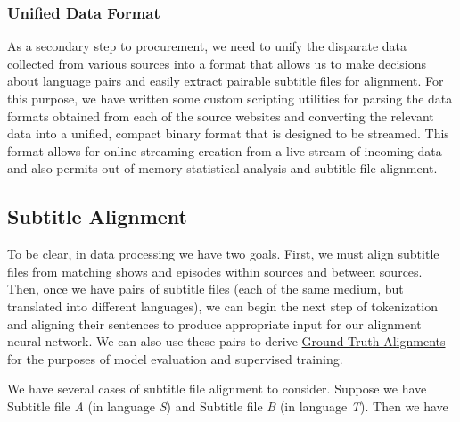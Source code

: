 \documentclass[twoside,twocolumn]{article}
\begin{document}
\subsubsection{Unified Data Format}

As a secondary step to procurement, we need to unify the disparate data
collected from various sources into a format that allows us to make decisions
about language pairs and easily extract pairable subtitle files for alignment.
For this purpose, we have written some custom scripting utilities for parsing
the data formats obtained from each of the source websites and converting the
relevant data into a unified, compact binary format that is designed to be
streamed. This format allows for online streaming creation from a live stream
of incoming data and also permits out of memory statistical analysis and
subtitle file alignment.


\subsection{Subtitle Alignment}
\label{subsec:subtitle-alignment}

To be clear, in data processing we have two goals. First, we must align
subtitle files from matching shows and episodes within sources and between
sources. Then, once we have pairs of subtitle files (each of the same medium,
but translated into different languages), we can begin the next step of
tokenization and aligning their sentences to produce appropriate input for
our alignment neural network. We can also use these pairs to derive
\hyperref[subsec:ground-truth-alignments]{Ground Truth Alignments} for the
purposes of model evaluation and supervised training.

We have several cases of subtitle file alignment to consider. Suppose we have
Subtitle file \textit{A} (in language \textit{S}) and Subtitle file \textit{B}
(in language \textit{T}). Then we have
\end{document}
